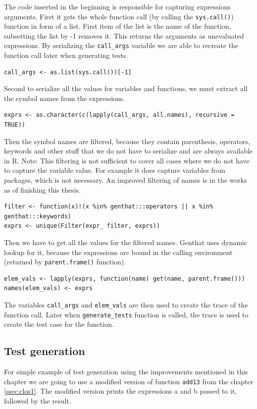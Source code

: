 \documentclass[thesis=B,english]{FITthesis}[2012/10/20]
\begin{document}
The code inserted in the beginning is responsible for capturing expressions arguments. First it gets the whole function call (by calling the \verb|sys.call()|) function in form of a list. First item of the list is the name of the function, subsetting the list by -1 removes it. This returns the arguments as unevaluated expressions. By serializing the \verb|call_args| variable we are able to recreate the function call later when generating tests.

\begin{verbatim}
call_args <- as.list(sys.call())[-1]
\end{verbatim}

Second to serialize all the values for variables and functions, we must extract all the symbol names from the expressions.

\begin{verbatim}
exprs <- as.character(c(lapply(call_args, all.names), recursive = TRUE))
\end{verbatim}

Then the symbol names are filtered, because they contain parenthesis, operators, keywords and other stuff that we do not have to serialize and are always available in R. 
Note: This filtering is not sufficient to cover all cases where we do not have to capture the variable value. For example it does capture variables from packages, which is not necessary. An improved filtering of names is in the works as of finishing this thesis.

\begin{verbatim}
filter <- function(x)!(x %in% genthat:::operators || x %in% genthat:::keywords)
exprs <- unique(Filter(expr_ filter, exprs))
\end{verbatim}

Then we have to get all the values for the filtered names. Genthat uses dynamic lookup for it, because the expressions are bound in the calling environment (returned by \verb|parent.frame()| function).

\begin{verbatim}
elem_vals <- lapply(exprs, function(name) get(name, parent.frame()))
names(elem_vals) <- exprs
\end{verbatim}

The variables \verb|call_args| and \verb|elem_vals| are then used to create the trace of the function call. Later when \verb|generate_tests| function is called, the trace is used to create the test case for the function.

\subsection{Test generation}
For simple example of test generation using the improvements mentioned in this chapter we are going to use a modified version of function \verb|add13| from the chapter \ref{ssec:clos1}. The modified version prints the expressions a and b passed to it, followed by the result.
\end{document}
